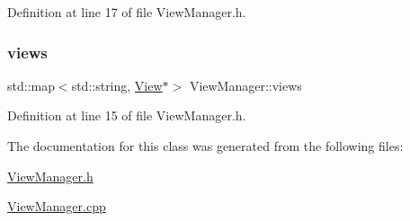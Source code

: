 Definition at line 17 of file View\+Manager.\+h.

\mbox{\label{class_view_manager_aaaa35009bf79352cab4cc1a66555e121}} 
\subsubsection{\texorpdfstring{views}{views}}
{\footnotesize\ttfamily std\+::map$<$std\+::string, \mbox{\hyperlink{class_view}{View}}$\ast$$>$ View\+Manager\+::views\hspace{0.3cm}{\ttfamily [private]}}



Definition at line 15 of file View\+Manager.\+h.



The documentation for this class was generated from the following files\+:\begin{DoxyCompactItemize}
\item 
\mbox{\hyperlink{_view_manager_8h}{View\+Manager.\+h}}\item 
\mbox{\hyperlink{_view_manager_8cpp}{View\+Manager.\+cpp}}\end{DoxyCompactItemize}
